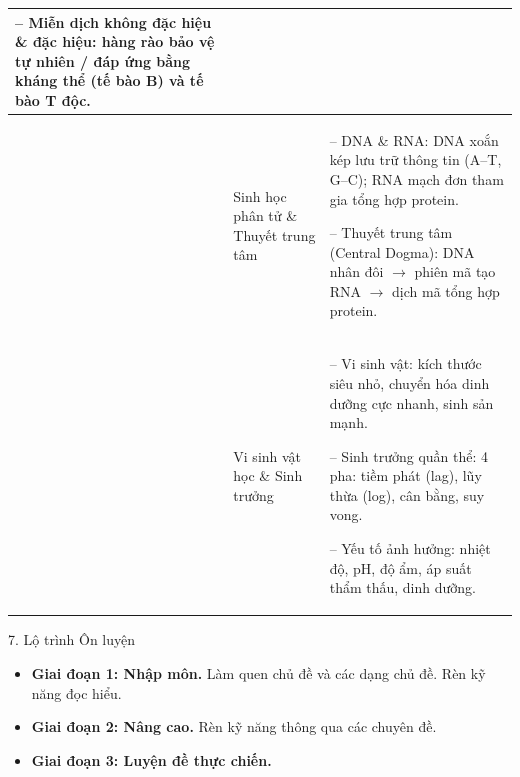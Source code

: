 \documentclass[12pt,a4paper,twoside]{article}
\begin{document}
{\begin{longtable}{|>{\centering\arraybackslash}m{0.8cm}|>{\centering\arraybackslash}m{3cm}|>{\raggedright\arraybackslash}m{11.5cm}|}
-- Miễn dịch không đặc hiệu \& đặc hiệu: hàng rào bảo vệ tự nhiên / đáp ứng bằng kháng thể (tế bào B) và tế bào T độc. \\
\hline
26 & Sinh học phân tử \& Thuyết trung tâm &
-- DNA \& RNA: DNA xoắn kép lưu trữ thông tin (A--T, G--C); RNA mạch đơn tham gia tổng hợp protein.

-- Thuyết trung tâm (Central Dogma): DNA nhân đôi $\rightarrow$ phiên mã tạo RNA $\rightarrow$ dịch mã tổng hợp protein. \\
\hline
27 & Vi sinh vật học \& Sinh trưởng &
-- Vi sinh vật: kích thước siêu nhỏ, chuyển hóa dinh dưỡng cực nhanh, sinh sản mạnh.

-- Sinh trưởng quần thể: 4 pha: tiềm phát (lag), lũy thừa (log), cân bằng, suy vong.

-- Yếu tố ảnh hưởng: nhiệt độ, pH, độ ẩm, áp suất thẩm thấu, dinh dưỡng. \\

\end{longtable}
}


\begin{sectionheader}{7. Lộ trình Ôn luyện}
\begin{itemize}[leftmargin=*, itemsep=5pt, label=\textcolor{accentBlue}{\textbf{--}}]
\item \textbf{Giai đoạn 1: Nhập môn.} Làm quen chủ đề và các dạng chủ đề. Rèn kỹ năng đọc hiểu.
\item \textbf{Giai đoạn 2: Nâng cao.} Rèn kỹ năng thông qua các chuyên đề.
\item \textbf{Giai đoạn 3: Luyện đề thực chiến.}
\end{itemize}
\end{sectionheader}
\end{document}
